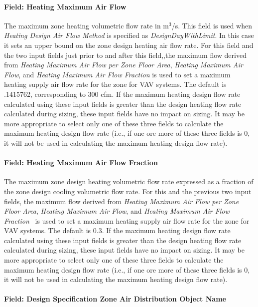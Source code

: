 \paragraph{Field: Heating Maximum Air Flow}\label{field-heating-maximum-air-flow}

The maximum zone heating volumetric flow rate in m\(^{3}\)/s. This field is used when \emph{Heating Design Air Flow Method} is specified as \emph{DesignDayWithLimit}. In this case it sets an upper bound on the zone design heating air flow rate. For this field and the two input fields just prior to and after this field,,the maximum flow derived from \emph{Heating Maximum Air Flow per Zone Floor Area}, \emph{Heating Maximum Air Flow}, and \emph{Heating Maximum Air Flow Fraction} is used to set a maximum heating supply air flow rate for the zone for VAV systems. The default is .1415762, corresponding to 300 cfm. If the maximum heating design flow rate calculated using these input fields is greater than the design heating flow rate calculated during sizing, these input fields have no impact on sizing. It may be more appropriate to select only one of these three fields to calculate the maximum heating design flow rate (i.e., if one ore more of these three fields is 0, it will not be used in calculating the maximum heating design flow rate).

\paragraph{Field: Heating Maximum Air Flow Fraction}\label{field-heating-maximum-air-flow-fraction}

The maximum zone design heating volumetric flow rate expressed as a fraction of the zone design cooling volumetric flow rate. For this and the previous two input fields, the maximum flow derived from \emph{Heating Maximum Air Flow per Zone Floor Area}, \emph{Heating Maximum Air Flow}, and \emph{Heating Maximum Air Flow Fraction}~ is used to set a maximum heating supply air flow rate for the zone for VAV systems. The default is 0.3. If the maximum heating design flow rate calculated using these input fields is greater than the design heating flow rate calculated during sizing, these input fields have no impact on sizing. It may be more appropriate to select only one of these three fields to calculate the maximum heating design flow rate (i.e., if one ore more of these three fields is 0, it will not be used in calculating the maximum heating design flow rate).

\paragraph{Field: Design Specification Zone Air Distribution Object Name}\label{field-design-specification-zone-air-distribution-object-name}

